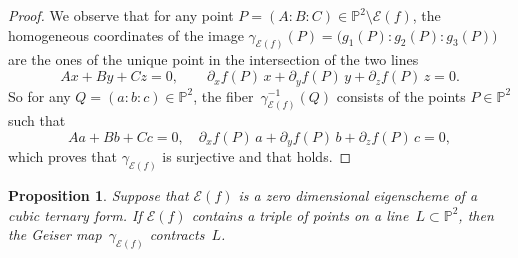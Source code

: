 \documentclass[a4paper, 11pt, reqno]{amsart}
\theoremstyle{plain}
\newtheorem{prop}[lemma]{Proposition}
\theoremstyle{definition}
\newcommand{\p}{\mathbb{P}}
\newcommand{\Eig}[1]{\mathcal{E}\!\left( {#1} \right)}
\begin{document}
\begin{proof}
We observe that for any point $P=(A:B:C) \in \p^2 \setminus \Eig{f}$, the homogeneous coordinates
of the image $\gamma_{\Eig{f}}(P) = \bigl( g_1(P): g_2(P): g_3(P) \bigr)$ are the ones of the unique point in the intersection of the two lines
%
\[
  Ax + By+ Cz = 0, \qquad
  \partial_x f(P) \, x + \partial_y f(P) \, y + \partial_z f(P) \, z = 0.
\]
%
So for any $Q = (a:b:c) \in \p^2$, the fiber~$\gamma_{\Eig{f}}^{-1}(Q)$ consists of the points $P \in \p^2$ such that
%
\begin{equation}
\label{eq:polars}
  Aa + Bb+ Cc = 0, \quad
  \partial_x f(P) \, a + \partial_y f(P) \, b + \partial_z f(P) \, c = 0,
\end{equation}
%
which proves that $\gamma_{\Eig{f}}$ is surjective and that  holds.
\end{proof}

\begin{prop}
\label{prop:allineati_contrae}
Suppose that $\Eig{f}$ is a zero dimensional eigenscheme of a cubic ternary form.
If $\Eig{f}$ contains a triple of points on a line~$L \subset \p^2$, then the Geiser map~$\gamma_{\Eig{f}}$ contracts~$L$.
\end{prop}
\end{document}
